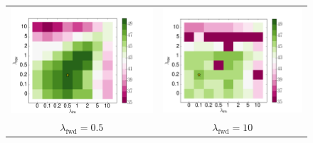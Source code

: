 \documentclass[11pt,a4paper]{article}
\begin{document}
\begin{figure}
\begin{tabular}{c c}
\includegraphics[scale=0.36]{0_2.png} & \includegraphics[scale=0.36]{5.png} \\
$\lambda_\text{fwd} = 0.5$ & $\lambda_\text{fwd} = 10$ \\

\end{tabular}
\end{figure}
\end{document}
